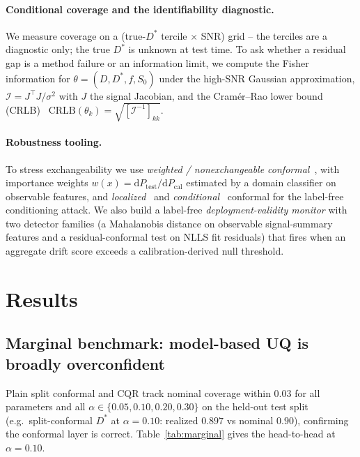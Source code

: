 \documentclass[11pt]{article}
\newcommand{\Dstar}{D^{*}}
\begin{document}
\paragraph{Conditional coverage and the identifiability diagnostic.}
We measure coverage on a (true-$\Dstar$ tercile $\times$ SNR) grid -- the terciles
are a diagnostic only; the true $\Dstar$ is unknown at test time. To ask whether a
residual gap is a method failure or an information limit, we compute the Fisher
information for $\theta=(D,\Dstar,f,S_0)$ under the high-SNR Gaussian approximation,
$\mathcal{I}=J^\top J/\sigma^2$ with $J$ the signal Jacobian, and the
Cram\'er--Rao lower bound (CRLB)~\citep{cramer1946}
$\mathrm{CRLB}(\theta_k)=\sqrt{[\mathcal{I}^{-1}]_{kk}}$.

\paragraph{Robustness tooling.}
To stress exchangeability we use \emph{weighted / nonexchangeable
conformal}~\citep{tibshirani2019,barber2023}, with importance weights
$w(x)=\mathrm{d}P_{\text{test}}/\mathrm{d}P_{\text{cal}}$ estimated by a domain
classifier on observable features, and \emph{localized}~\citep{guan2023} and
\emph{conditional}~\citep{gibbs2023} conformal for the label-free conditioning
attack. We also build a label-free \emph{deployment-validity monitor} with two
detector families (a Mahalanobis distance on observable signal-summary features and
a residual-conformal test on NLLS fit residuals) that fires when an aggregate drift
score exceeds a calibration-derived null threshold.

\section{Results}

\subsection{Marginal benchmark: model-based UQ is broadly overconfident}
\label{sec:marginal}
Plain split conformal and CQR track nominal coverage within $0.03$ for all
parameters and all $\alpha\in\{0.05,0.10,0.20,0.30\}$ on the held-out test split
(e.g.\ split-conformal $\Dstar$ at $\alpha{=}0.10$: realized $0.897$ vs nominal
$0.90$), confirming the conformal layer is correct. Table~\ref{tab:marginal} gives
the head-to-head at $\alpha=0.10$.
\end{document}

